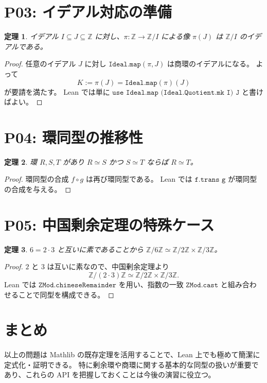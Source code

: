 \documentclass[a4paper,11pt]{ltjsarticle}
\newtheorem{theorem}{定理}[section]
\theoremstyle{definition}
\theoremstyle{remark}
\begin{document}
\section{P03: イデアル対応の準備}

\begin{theorem}
イデアル $I\subseteq J\subseteq\mathbb{Z}$ に対し、$\pi:\mathbb{Z}\to\mathbb{Z}/I$ による像 $\pi(J)$ は $\mathbb{Z}/I$ のイデアルである。
\end{theorem}

\begin{proof}
任意のイデアル $J$ に対し $ \texttt{Ideal.map}(\pi, J) $ は商環のイデアルになる。
よって
\[
K := \pi(J) = \texttt{Ideal.map}(\pi)(J)
\]
が要請を満たす。
Lean では単に $ \texttt{use Ideal.map (Ideal.Quotient.mk I) J} $ と書けばよい。
\end{proof}

\section{P04: 環同型の推移性}

\begin{theorem}
環 $R,S,T$ があり $R\simeq S$ かつ $S\simeq T$ ならば $R\simeq T$。
\end{theorem}

\begin{proof}
環同型の合成 $f\circ g$ は再び環同型である。
Lean では $\texttt{f.trans g}$ が環同型の合成を与える。
\end{proof}

\section{P05: 中国剰余定理の特殊ケース}

\begin{theorem}
$6=2\cdot 3$ と互いに素であることから $\mathbb{Z}/6\mathbb{Z} \simeq \mathbb{Z}/2\mathbb{Z}\times\mathbb{Z}/3\mathbb{Z}$。
\end{theorem}

\begin{proof}
$2$ と $3$ は互いに素なので、中国剰余定理より
\[
\mathbb{Z}/(2\cdot3)\mathbb{Z} \simeq \mathbb{Z}/2\mathbb{Z} \times \mathbb{Z}/3\mathbb{Z}.
\]
Lean では $\texttt{ZMod.chineseRemainder}$ を用い、指数の一致 $\texttt{ZMod.cast}$ と組み合わせることで同型を構成できる。
\end{proof}

\begin{center}
\end{center}

\section{まとめ}

以上の問題は Mathlib の既存定理を活用することで、Lean 上でも極めて簡潔に定式化・証明できる。
特に剰余環や商環に関する基本的な同型の扱いが重要であり、これらの API を把握しておくことは今後の演習に役立つ。
\end{document}
